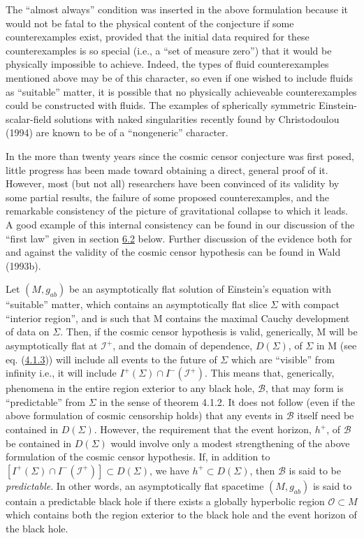 \documentclass[11pt,a4paper]{article}
\begin{document}
The ``almost always'' condition was inserted in the above formulation because it would not be fatal to the physical content of the conjecture if some counterexamples exist, provided that the initial data required for these counterexamples is so special (i.e., a ``set of measure zero'') that it would be physically impossible to achieve. Indeed, the types of fluid counterexamples mentioned above may be of this character, so even if one wished to include fluids as ``suitable'' matter, it is possible that no physically achieveable counterexamples could be constructed with fluids. The examples of spherically symmetric Einstein-scalar-field solutions with naked singularities recently found by Christodoulou (1994) are known to be of a ``nongeneric'' character.

In the more than twenty years since the cosmic censor conjecture was first posed, little progress has been made toward obtaining a direct, general proof of it. However, most (but not all) researchers have been convinced of its validity by some partial results, the failure of some proposed counterexamples, and the remarkable consistency of the picture of gravitational collapse to which it leads. A good example of this internal consistency can be found in our \hypertarget{source-150}{} discussion of the ``first law'' given in section \hyperlink{sec:6.2}{6.2} below. Further discussion of the evidence both for and against the validity of the cosmic censor hypothesis can be found in Wald (1993b).

Let \((M,g_{ab})\) be an asymptotically flat solution of Einstein's equation with ``suitable'' matter, which contains an asymptotically flat slice \(\Sigma\) with compact ``interior region'', and is such that M contains the maximal Cauchy development of data on \(\Sigma\). Then, if the cosmic censor hypothesis is valid, generically, M will be asymptotically flat at \(\mathscr{I}^+\), and the domain of dependence, \(D(\Sigma)\), of \(\Sigma\) in M (see eq. (\hyperref[eq:4.1.3]{4.1.3})) will include all events to the future of \(\Sigma\) which are ``visible'' from infinity i.e., it will include \(I^+(\Sigma) \cap I^-(\mathscr{I}^+)\). This means that, generically, phenomena in the entire region exterior to any black hole, \(\mathcal B\), that may form is ``predictable'' from \(\Sigma\) in the sense of theorem 4.1.2. It does not follow (even if the above formulation of cosmic censorship holds) that any events in \(\mathcal B\) itself need be contained in \(D(\Sigma)\). However, the requirement that the event horizon, \(h^+\), of \(\mathcal{B}\) be contained in \(D(\Sigma)\) would involve only a modest strengthening of the above formulation of the cosmic censor hypothesis. If, in addition to \([I^+(\Sigma)\cap I^-(\mathscr{I}^+)]\subset D(\Sigma)\), we have \(h^+\subset D(\Sigma)\), then \(\mathcal{B}\) is said to be \emph{predictable}. In other words, an asymptotically flat spacetime \((M,g_{ab})\) is said to contain a predictable black hole if there exists a globally hyperbolic region \(\mathcal O\subset M\) which contains both the region exterior to the black hole and the event horizon of the black hole.
\end{document}
